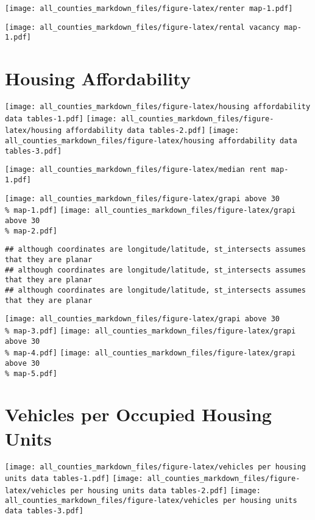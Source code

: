 \documentclass[
]{article}
\begin{document}
\texttt{[image: all\_counties\_markdown\_files/figure-latex/renter map-1.pdf]}

\texttt{[image: all\_counties\_markdown\_files/figure-latex/rental vacancy map-1.pdf]}

\hypertarget{housing-affordability}{%
\section{Housing Affordability}\label{housing-affordability}}

\texttt{[image: all\_counties\_markdown\_files/figure-latex/housing affordability data tables-1.pdf]}
\texttt{[image: all\_counties\_markdown\_files/figure-latex/housing affordability data tables-2.pdf]}
\texttt{[image: all\_counties\_markdown\_files/figure-latex/housing affordability data tables-3.pdf]}

\texttt{[image: all\_counties\_markdown\_files/figure-latex/median rent map-1.pdf]}

\texttt{[image: all\_counties\_markdown\_files/figure-latex/grapi above 30\\\% map-1.pdf]}
\texttt{[image: all\_counties\_markdown\_files/figure-latex/grapi above 30\\\% map-2.pdf]}

\begin{verbatim}
## although coordinates are longitude/latitude, st_intersects assumes that they are planar
## although coordinates are longitude/latitude, st_intersects assumes that they are planar
## although coordinates are longitude/latitude, st_intersects assumes that they are planar
\end{verbatim}

\texttt{[image: all\_counties\_markdown\_files/figure-latex/grapi above 30\\\% map-3.pdf]}
\texttt{[image: all\_counties\_markdown\_files/figure-latex/grapi above 30\\\% map-4.pdf]}
\texttt{[image: all\_counties\_markdown\_files/figure-latex/grapi above 30\\\% map-5.pdf]}

\hypertarget{vehicles-per-occupied-housing-units}{%
\section{Vehicles per Occupied Housing
Units}\label{vehicles-per-occupied-housing-units}}

\texttt{[image: all\_counties\_markdown\_files/figure-latex/vehicles per housing units data tables-1.pdf]}
\texttt{[image: all\_counties\_markdown\_files/figure-latex/vehicles per housing units data tables-2.pdf]}
\texttt{[image: all\_counties\_markdown\_files/figure-latex/vehicles per housing units data tables-3.pdf]}
\end{document}
